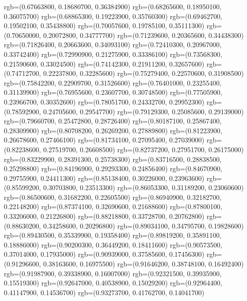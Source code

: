 {{        rgb=(0.67663800, 0.18680700, 0.36384900)
        rgb=(0.68265600, 0.18950100, 0.36075700)
        rgb=(0.68865300, 0.19223900, 0.35760300)
        rgb=(0.69462700, 0.19502100, 0.35438800)
        rgb=(0.70057600, 0.19785100, 0.35111300)
        rgb=(0.70650000, 0.20072800, 0.34777700)
        rgb=(0.71239600, 0.20365600, 0.34438300)
        rgb=(0.71826400, 0.20663600, 0.34093100)
        rgb=(0.72410300, 0.20967000, 0.33742400)
        rgb=(0.72990900, 0.21275900, 0.33386100)
        rgb=(0.73568300, 0.21590600, 0.33024500)
        rgb=(0.74142300, 0.21911200, 0.32657600)
        rgb=(0.74712700, 0.22237800, 0.32285600)
        rgb=(0.75279400, 0.22570600, 0.31908500)
        rgb=(0.75842200, 0.22909700, 0.31526600)
        rgb=(0.76401000, 0.23255400, 0.31139900)
        rgb=(0.76955600, 0.23607700, 0.30748500)
        rgb=(0.77505900, 0.23966700, 0.30352600)
        rgb=(0.78051700, 0.24332700, 0.29952300)
        rgb=(0.78592900, 0.24705600, 0.29547700)
        rgb=(0.79129300, 0.25085600, 0.29139000)
        rgb=(0.79660700, 0.25472800, 0.28726400)
        rgb=(0.80187100, 0.25867400, 0.28309900)
        rgb=(0.80708200, 0.26269200, 0.27889800)
        rgb=(0.81223900, 0.26678600, 0.27466100)
        rgb=(0.81734100, 0.27095400, 0.27039000)
        rgb=(0.82238600, 0.27519700, 0.26608500)
        rgb=(0.82737200, 0.27951700, 0.26175000)
        rgb=(0.83229900, 0.28391300, 0.25738300)
        rgb=(0.83716500, 0.28838500, 0.25298800)
        rgb=(0.84196900, 0.29293300, 0.24856400)
        rgb=(0.84670900, 0.29755900, 0.24411300)
        rgb=(0.85138400, 0.30226000, 0.23963600)
        rgb=(0.85599200, 0.30703800, 0.23513300)
        rgb=(0.86053300, 0.31189200, 0.23060600)
        rgb=(0.86500600, 0.31682200, 0.22605500)
        rgb=(0.86940900, 0.32182700, 0.22148200)
        rgb=(0.87374100, 0.32690600, 0.21688600)
        rgb=(0.87800100, 0.33206000, 0.21226800)
        rgb=(0.88218800, 0.33728700, 0.20762800)
        rgb=(0.88630200, 0.34258600, 0.20296800)
        rgb=(0.89034100, 0.34795700, 0.19828600)
        rgb=(0.89430500, 0.35339900, 0.19358400)
        rgb=(0.89819200, 0.35891100, 0.18886000)
        rgb=(0.90200300, 0.36449200, 0.18411600)
        rgb=(0.90573500, 0.37014000, 0.17935000)
        rgb=(0.90939000, 0.37585600, 0.17456300)
        rgb=(0.91296600, 0.38163600, 0.16975500)
        rgb=(0.91646200, 0.38748100, 0.16492400)
        rgb=(0.91987900, 0.39338900, 0.16007000)
        rgb=(0.92321500, 0.39935900, 0.15519300)
        rgb=(0.92647000, 0.40538900, 0.15029200)
        rgb=(0.92964400, 0.41147900, 0.14536700)
        rgb=(0.93273700, 0.41762700, 0.14041700)
}}
